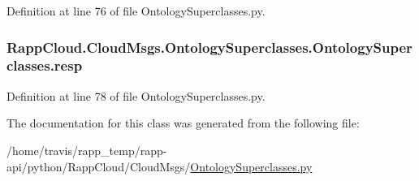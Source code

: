 Definition at line 76 of file Ontology\-Superclasses.\-py.

\hypertarget{classRappCloud_1_1CloudMsgs_1_1OntologySuperclasses_1_1OntologySuperclasses_a2db9653ccbfa28da8eca4e46366de88e}{
\subsubsection[{resp}]{\setlength{\rightskip}{0pt plus 5cm}Rapp\-Cloud.\-Cloud\-Msgs.\-Ontology\-Superclasses.\-Ontology\-Superclasses.\-resp}}\label{classRappCloud_1_1CloudMsgs_1_1OntologySuperclasses_1_1OntologySuperclasses_a2db9653ccbfa28da8eca4e46366de88e}


Definition at line 78 of file Ontology\-Superclasses.\-py.



The documentation for this class was generated from the following file\-:\begin{DoxyCompactItemize}
\item 
/home/travis/rapp\-\_\-temp/rapp-\/api/python/\-Rapp\-Cloud/\-Cloud\-Msgs/\hyperlink{OntologySuperclasses_8py}{Ontology\-Superclasses.\-py}\end{DoxyCompactItemize}
